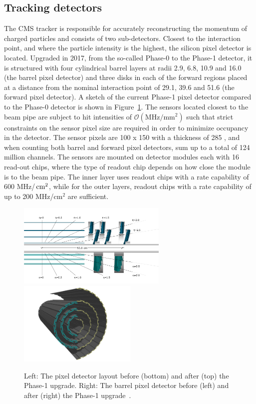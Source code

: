 \subsection{Tracking detectors}
The CMS tracker is responsible for accurately reconstructing the momentum of charged particles and consists of two sub-detectors. Closest to the interaction point, and where the particle intensity is the highest, the silicon pixel detector is located. Upgraded in 2017, from the so-called Phase-0 to the Phase-1 detector, it is structured with four cylindrical barrel layers at radii 2.9, 6.8, 10.9 and 16.0 \cm (the barrel pixel detector) and three disks in each of the forward regions placed at a distance from the nominal interaction point of 29.1, 39.6 and 51.6 \cm (the forward pixel detector). A sketch of the current Phase-1 pixel detector compared to the Phase-0 detector is shown in Figure~\ref{fig:cms:pixel}. The sensors located closest to the beam pipe are subject to hit intensities of $\mathcal{O}( \textrm{MHz}/\textrm{mm}^2 )$ such that strict constraints on the sensor pixel size are required in order to minimize occupancy in the detector. The sensor pixels are 100 \micron x 150 \micron with a thickness of 285 \micron, and when counting both barrel and forward pixel detectors, sum up to a total of 124 million channels. The sensors are mounted on detector modules each with 16 read-out chips, where the type of readout chip depends on how close the module is to the beam pipe. The inner layer uses readout chips with a rate capability of 600 MHz/$\,\text{cm}^2$, while for the outer layers, readout chips with a rate capability of up to 200 MHz/$\textrm{cm}^2$ are sufficient.
\begin{figure}[h] 
    \centering  
    \includegraphics[height=4cm,keepaspectratio]{figures/cms/20120828_01_pixel_phase1_largesharp.png}
    \includegraphics[height=4cm,keepaspectratio]{figures/cms/20120827_01_pixel_phase1_04.png}
    \caption{Left: The pixel detector layout before (bottom) and after (top) the Phase-1 upgrade. Right: The barrel pixel detector before (left) and after (right) the Phase-1 upgrade~\cite{Dominguez:1481838}.}
    \label{fig:cms:pixel}
\end{figure}
